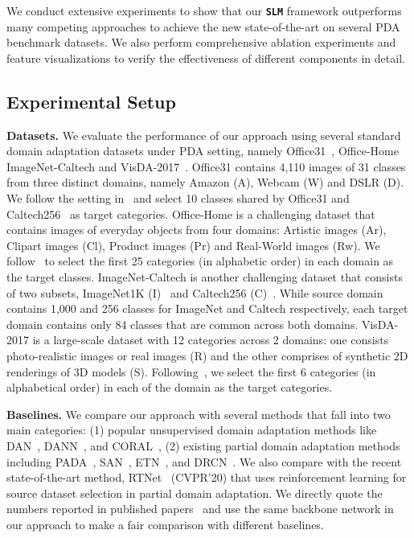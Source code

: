 \documentclass[10pt,twocolumn,letterpaper]{article}
\def\ours{\texttt{\textbf{SLM}}\xspace}
\begin{document}
We conduct extensive experiments to show that our \ours framework outperforms many competing approaches to achieve the new state-of-the-art on several PDA benchmark datasets. We also perform comprehensive ablation experiments and feature visualizations to verify the effectiveness of different components in detail.

\subsection{Experimental Setup}

\noindent\textbf{Datasets.} We evaluate the performance of our approach using several standard domain adaptation datasets under PDA setting, namely Office31~\cite{saenko2010adapting}, Office-Home~\cite{venkateswara2017deep} ImageNet-Caltech and VisDA-2017~\cite{peng2017visda}. 
Office31 contains 4,110 images of 31 classes from three distinct domains, namely Amazon (A), Webcam (W) and DSLR (D). We follow the setting in~\cite{chen2020selective,li2020deep} and select 10 classes shared by Office31 and Caltech256~\cite{griffin2007caltech} as target categories. Office-Home is a challenging dataset that contains images of everyday objects from four domains: Artistic images (Ar), Clipart images (Cl), Product images (Pr) and Real-World images (Rw). We follow~\cite{chen2020selective} to select the first 25 categories (in alphabetic order) in each domain as the target classes. 
ImageNet-Caltech is another challenging dataset that consists of two subsets, ImageNet1K (I)~\cite{russakovsky2015imagenet} and Caltech256 (C)~\cite{griffin2007caltech}. While source domain contains 1,000 and 256 classes for ImageNet and Caltech respectively, each target domain contains only 84 classes that are common across both domains.
VisDA-2017 is a large-scale dataset with 12 categories across 2 domains: one consists photo-realistic images or real images (R) and the other comprises of synthetic 2D renderings of 3D models (S). Following~\cite{li2020deep}, we select the first 6 categories (in alphabetical order) in each of the domain as the target categories.

\vspace{1mm}
\noindent\textbf{Baselines.} We compare our approach with several methods that fall into two main categories: (1) popular unsupervised domain adaptation methods like DAN~\cite{long2015learning}, DANN~\cite{ganin2016domain}, and CORAL~\cite{sun2016deep}, (2) existing partial domain adaptation methods including PADA~\cite{cao2018partialpada}, SAN~\cite{cao2018partialsan}, ETN~\cite{cao2019learning}, and DRCN~\cite{li2020deep}. We also compare with the recent state-of-the-art method, RTNet~\cite{chen2020selective} (CVPR'20) that uses reinforcement learning for source dataset selection in partial domain adaptation. We directly quote the numbers reported in published papers~\cite{chen2020selective,li2020deep} and use the same backbone network in our approach to make a fair comparison with different baselines.
\end{document}
